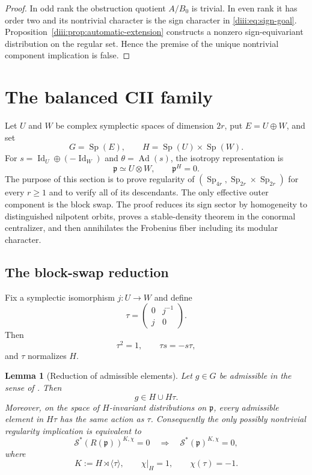 \documentclass[10pt,a4paper]{amsart}
\numberwithin{equation}{section}
\newtheorem{lemma}[theorem]{Lemma}
\newcommand{\Sp}{\operatorname{Sp}}
\newcommand{\Ad}{\operatorname{Ad}}
\newcommand{\Id}{\operatorname{Id}}
\newcommand{\fp}{\mathfrak p}
\newcommand{\cS}{\mathcal S}
\begin{document}
\begin{proof}
In odd rank the obstruction quotient $A/B_0$ is trivial.  In even rank it has
order two and its nontrivial character is the sign character in
\eqref{diii:eq:sign-goal}.  Proposition~\ref{diii:prop:automatic-extension}
constructs a nonzero sign-equivariant distribution on the regular set.  Hence
the premise of the unique nontrivial component implication is false.
\end{proof}


\section{The balanced CII family}\label{sec:CII-family}

Let $U$ and $W$ be complex symplectic spaces of dimension $2r$, put
$E=U\oplus W$, and set
\[
 G=\Sp(E),\qquad H=\Sp(U)\times\Sp(W).
\]
For $s=\Id_U\oplus(-\Id_W)$ and $\theta=\Ad(s)$, the isotropy representation is
\[
 \fp\simeq U\otimes W,
 \qquad \fp^H=0.
\]
The purpose of this section is to prove regularity of
$(\Sp_{4r},\Sp_{2r}\times\Sp_{2r})$ for every $r\ge1$ and to verify all of its
descendants.  The only effective outer component is the block swap.  The proof
reduces its sign sector by homogeneity to distinguished nilpotent orbits, proves
a stable-density theorem in the conormal centralizer, and then annihilates the
Frobenius fiber including its modular character.

\subsection{The block-swap reduction}
Fix a symplectic isomorphism \(j:U\to W\) and define
\[
\tau=
\begin{pmatrix}
0&j^{-1}\\
j&0
\end{pmatrix}.
\]
Then
\[
\tau^2=1,\qquad \tau s=-s\tau,
\]
and \(\tau\) normalizes \(H\).

\begin{lemma}[Reduction of admissible elements]\label{cii:lem:admissible-components}
Let \(g\in G\) be admissible in the sense of
\cite[Definition~7.4.1]{AG09}.  Then
\[
g\in H\cup H\tau.
\]
Moreover, on the space of \(H\)-invariant distributions on \(\mathfrak p\),
every admissible element in \(H\tau\) has the same action as \(\tau\).
Consequently the only possibly nontrivial regularity implication is
equivalent to
\[
\cS^*(R(\mathfrak p))^{K,\chi}=0
\quad\Longrightarrow\quad
\cS^*(\mathfrak p)^{K,\chi}=0,
\]
where
\[
K:=H\rtimes\langle\tau\rangle,
\qquad
\chi|_H=1,\qquad
\chi(\tau)=-1.
\]
\end{lemma}
\end{document}
